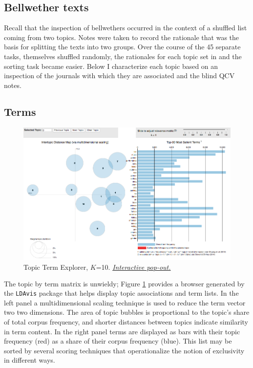 \documentclass[]{book}
\theoremstyle{definition}
\theoremstyle{definition}
\theoremstyle{definition}
\theoremstyle{remark}
\begin{document}
\hypertarget{bellwether-texts}{%
\subsection{Bellwether texts}\label{bellwether-texts}}

Recall that the inspection of bellwethers occurred in the context of a
shuffled list coming from two topics. Notes were taken to record the
rationale that was the basis for splitting the texts into two groups.
Over the course of the 45 separate tasks, themselves shuffled randomly,
the rationales for each topic set in and the sorting task became easier.
Below I characterize each topic based on an inspection of the journals
with which they are associated and the blind QCV notes.

\hypertarget{terms}{%
\subsection{Terms}\label{terms}}





\begin{figure}

{\centering \includegraphics[width=0.9\linewidth]{img/genr-mod-viz} 

}

\caption{Topic Term Explorer, \(K\)=10.
\href{https://brooksambrose.github.io/portfolio/ldaviz/viz/index.html}{\emph{Interactive
pop-out.}}}\label{fig:genr-mod-viz}
\end{figure}

The topic by term matrix is unwieldy; Figure \ref{fig:genr-mod-viz}
provides a browser generated by the \texttt{LDAvis} package that helps
display topic associations and term lists. In the left panel a
multidimensional scaling technique is used to reduce the term vector two
two dimensions. The area of topic bubbles is proportional to the topic's
share of total corpus frequency, and shorter distances between topics
indicate similarity in term content. In the right panel terms are
displayed as bars with their topic frequency (red) as a share of their
corpus frequency (blue). This list may be sorted by several scoring
techniques that operationalize the notion of exclusivity in different
ways.
\end{document}
